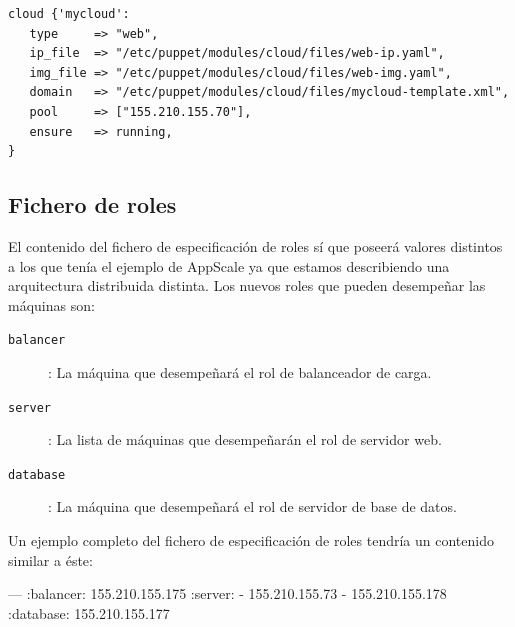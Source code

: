 \begin{lstlisting}
cloud {'mycloud':
   type     => "web",
   ip_file  => "/etc/puppet/modules/cloud/files/web-ip.yaml",
   img_file => "/etc/puppet/modules/cloud/files/web-img.yaml",
   domain   => "/etc/puppet/modules/cloud/files/mycloud-template.xml",
   pool     => ["155.210.155.70"],
   ensure   => running,
}
\end{lstlisting}

\subsection{Fichero de roles}

El contenido del fichero de especificación de roles sí que poseerá valores distintos a los que tenía el ejemplo de AppScale ya que estamos describiendo una arquitectura distribuida distinta. Los nuevos roles que pueden desempeñar las máquinas son:
\begin{description}
\item[\texttt{balancer}]: La máquina que desempeñará el rol de balanceador de carga.
\item[\texttt{server}]: La lista de máquinas que desempeñarán el rol de servidor web.
\item[\texttt{database}]: La máquina que desempeñará el rol de servidor de base de datos.
\end{description}

Un ejemplo completo del fichero de especificación de roles tendría un contenido similar a éste:
\begin{yamlcode}
--- 
:balancer: 155.210.155.175
:server:
- 155.210.155.73
- 155.210.155.178
:database: 155.210.155.177
\end{yamlcode}
